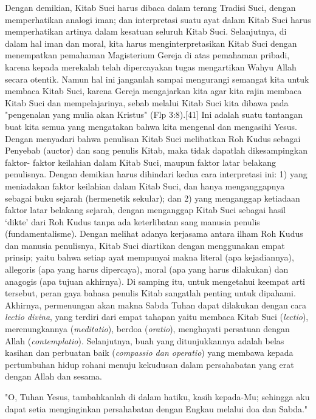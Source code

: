 Dengan demikian, Kitab Suci harus dibaca dalam terang Tradisi Suci, dengan memperhatikan analogi iman; dan interpretasi suatu ayat dalam Kitab Suci harus memperhatikan artinya dalam kesatuan seluruh Kitab Suci. Selanjutnya, di dalam hal iman dan moral, kita harus menginterpretasikan Kitab Suci dengan menempatkan pemahaman Magisterium Gereja di atas pemahaman pribadi, karena kepada merekalah telah dipercayakan tugas mengartikan Wahyu Allah secara otentik. Namun hal ini janganlah sampai mengurangi semangat kita untuk membaca Kitab Suci, karena Gereja mengajarkan kita agar kita rajin membaca Kitab Suci dan mempelajarinya, sebab melalui Kitab Suci kita dibawa pada "pengenalan yang mulia akan Kristus" (Flp 3:8).[41] Ini adalah suatu tantangan buat kita semua yang mengatakan bahwa kita mengenal dan mengasihi Yesus.
Dengan menyadari bahwa penulisan Kitab Suci melibatkan Roh Kudus sebagai Penyebab (auctor) dan sang penulis Kitab, maka tidak dapatlah dikesampingkan faktor- faktor keilahian dalam Kitab Suci, maupun faktor latar belakang penulisnya. Dengan demikian harus dihindari kedua cara interpretasi ini: 1) yang meniadakan faktor keilahian dalam Kitab Suci, dan hanya menganggapnya sebagai buku sejarah (hermenetik sekular); dan 2) yang menganggap ketiadaan faktor latar belakang sejarah, dengan menganggap Kitab Suci sebagai hasil ‘dikte’ dari Roh Kudus tanpa ada keterlibatan sang manusia penulis (fundamentalisme). Dengan melihat adanya kerjasama antara ilham Roh Kudus dan manusia penulisnya, Kitab Suci diartikan dengan menggunakan empat prinsip; yaitu bahwa setiap ayat mempunyai makna literal (apa kejadiannya), allegoris (apa yang harus dipercaya), moral (apa yang harus dilakukan) dan anagogis (apa tujuan akhirnya). Di samping itu, untuk mengetahui keempat arti tersebut, peran gaya bahasa penulis Kitab sangatlah penting untuk dipahami.
Akhirnya, permenungan akan makna Sabda Tuhan dapat dilakukan dengan cara \textit{lectio divina}, yang terdiri dari empat tahapan yaitu membaca Kitab Suci (\textit{lectio}), merenungkannya (\textit{meditatio}), berdoa (\textit{oratio}), menghayati persatuan dengan Allah (\textit{contemplatio}). Selanjutnya, buah yang ditunjukkannya adalah belas kasihan dan perbuatan baik (\textit{compassio dan operatio}) yang membawa kepada pertumbuhan hidup rohani menuju kekudusan dalam persahabatan yang erat dengan Allah dan sesama.

"O, Tuhan Yesus, tambahkanlah di dalam hatiku, kasih kepada-Mu; sehingga aku dapat setia menginginkan persahabatan dengan Engkau melalui doa dan Sabda."